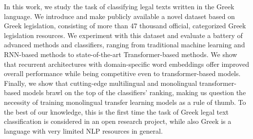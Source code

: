 In this work, we study the task of classifying legal texts written in the Greek language. We introduce and make publicly available a novel dataset based on Greek legislation, consisting of more than 47 thousand official, categorized Greek legislation resources. We experiment with this dataset and evaluate a battery of advanced methods and classifiers, ranging from traditional machine learning and RNN-based methods to state-of-the-art Transformer-based methods. We show that recurrent architectures with domain-specific word embeddings offer improved overall performance while being competitive even to transformer-based models. Finally, we show that cutting-edge multilingual and monolingual transformer-based models brawl on the top of the classifiers' ranking, making us question the necessity of training monolingual transfer learning models as a rule of thumb. To the best of our knowledge, this is the first time the task of Greek legal text classification is considered in an open research project, while also Greek is a language with very limited NLP resources in general.
